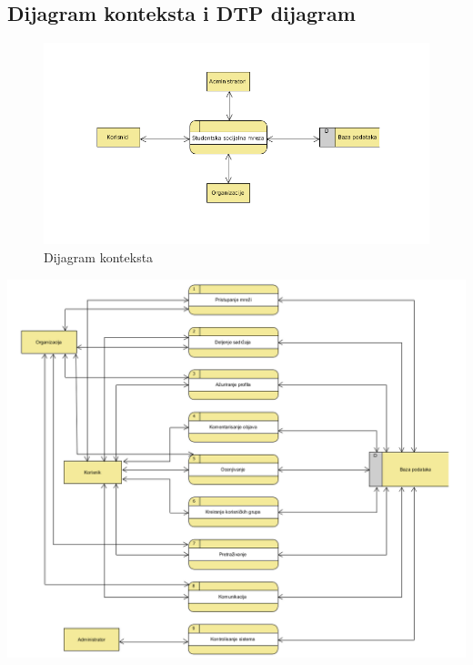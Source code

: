 \subsection{Dijagram konteksta i DTP dijagram}
\begin{figure}[h!]
    \centering
    \includegraphics[width=\linewidth]{slike/dijagram_konteksta.png}
    \caption{Dijagram konteksta}
    \label{fig:my_label}
\end{figure}
\begin{center}
   \includegraphics[width=\linewidth]{slike/dtp.png}
\end{center}